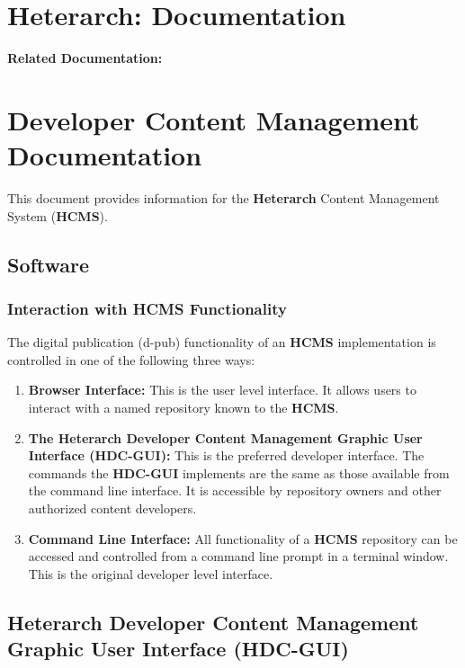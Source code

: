 \documentclass[12pt]{article}
\begin{document}
\section{Heterarch: Documentation}

{\bf Related Documentation:}

\section{Developer Content Management Documentation}

This document provides information for the {\bf \small Heterarch} Content Management System ({\bf \small HCMS}).

\subsection{Software}

\subsubsection{Interaction with {\bf \small HCMS} Functionality}

The digital publication (d-pub) functionality of an {\bf \small HCMS} implementation is controlled in one of the following three ways:

\begin{enumerate}
\item{\bf Browser Interface:} This is the user level interface. It allows users to interact with a named repository known to the {\bf \small HCMS}.
\item {\bf The Heterarch Developer Content Management Graphic User Interface (HDC-GUI):} This is the preferred developer interface. The commands the {\bf \small HDC-GUI} implements are the same as those available from the command line interface. It is accessible by repository owners and other authorized content developers.
\item {\bf Command Line Interface:} All functionality of a {\bf \small HCMS} repository can be accessed and controlled from a command line prompt in a terminal window. This is the original developer level interface.
\end{enumerate}

\subsection{Heterarch Developer Content Management Graphic User Interface (HDC-GUI)}
\end{document}
